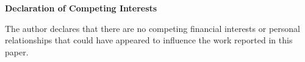 
\noindent\textbf{Declaration of Competing Interests}

\medskip
\noindent
The author declares that there are no competing financial interests or
personal relationships that could have appeared to influence the work
reported in this paper.
